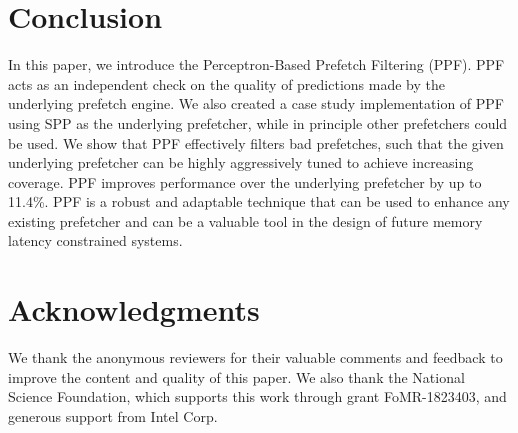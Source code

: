 \section{Conclusion}
\label{Conclusion}
In this paper, we introduce the Perceptron-Based Prefetch Filtering
(PPF).  PPF acts as an independent check on the quality of predictions
made by the underlying prefetch engine.  We also created a case study
implementation of PPF using SPP as the underlying prefetcher, while
in principle other prefetchers could be used.  We show that PPF
effectively filters bad prefetches, such that the given underlying
prefetcher can be highly aggressively tuned to achieve increasing
coverage.  PPF improves performance over the underlying 
prefetcher by up to 11.4\%.  PPF is a robust and adaptable technique 
that can be used to enhance any existing prefetcher and can be a 
valuable tool in the design of future memory latency constrained systems.

\section{Acknowledgments}

We thank the anonymous reviewers for their valuable comments and
feedback to improve the content and quality of this paper.  We also
thank the National Science Foundation, which supports this work
through grant FoMR-1823403, and generous support from Intel Corp.
